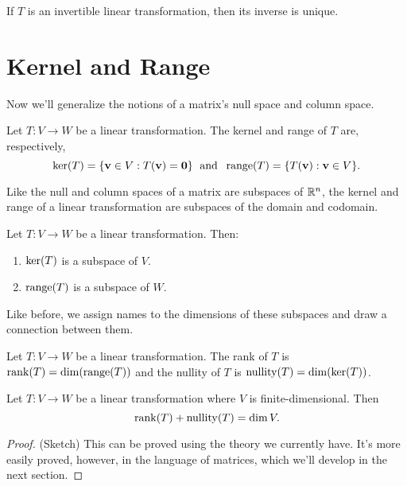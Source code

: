 \documentclass[../m073main.tex]{subfiles}
\begin{document}
\begin{theorem}
	If $T$ is an invertible linear transformation, then its inverse is unique.
\end{theorem}

\section{Kernel and Range}
Now we'll generalize the notions of a matrix's null space and column space.

\begin{definition}
	Let $T : V \to W$ be a linear transformation.
	The kernel and range of $T$ are, respectively,
	\[ \operatorname{ker}(T) = \{\mathbf{v} \in V : T(\mathbf{v}) = \mathbf{0}\} \;\text{ and }\; \operatorname{range}(T) = \{T(\mathbf{v}) : \mathbf{v} \in V\}. \]
\end{definition}

Like the null and column spaces of a matrix are subspaces of $\mathbb{R}^n$, the kernel and range of a linear transformation are subspaces of the domain and codomain.

\begin{theorem}
	Let $T : V \to W$ be a linear transformation.
	Then:
	\begin{enumerate}[label=(\alph*)]
		\item $\operatorname{ker}(T)$ is a subspace of $V$.
		\item $\operatorname{range}(T)$ is a subspace of $W$.
	\end{enumerate}
\end{theorem}

Like before, we assign names to the dimensions of these subspaces and draw a connection between them.

\pagebreak

\begin{definition}
	Let $T : V \to W$ be a linear transformation.
	The rank of $T$ is $\operatorname{rank}(T) = \dim (\operatorname{range}(T))$ and the nullity of $T$ is $\operatorname{nullity}(T) = \dim (\operatorname{ker}(T))$.
\end{definition}

\begin{theorem}
	Let $T : V \to W$ be a linear transformation where $V$ is finite-dimensional.
	Then
	\[ \operatorname{rank}(T) + \operatorname{nullity}(T) = \dim V. \]
\end{theorem}

\begin{proof}
	(Sketch) This can be proved using the theory we currently have.
	It's more easily proved, however, in the language of matrices, which we'll develop in the next section.
\end{proof}
\end{document}
